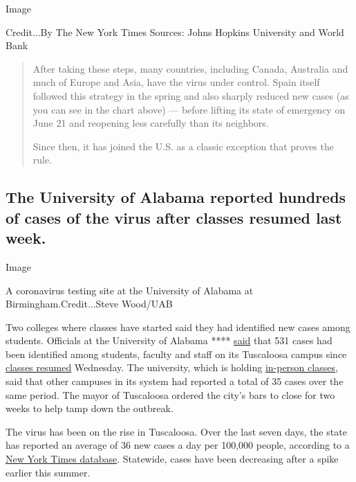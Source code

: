 Image

Credit...By The New York Times \textbar{} Sources: Johns Hopkins
University and World Bank

\begin{quote}
After taking these steps, many countries, including Canada, Australia
and much of Europe and Asia, have the virus under control. Spain itself
followed this strategy in the spring and also sharply reduced new cases
(as you can see in the chart above) --- before lifting its state of
emergency on June 21 and reopening less carefully than its neighbors.

Since then, it has joined the U.S. as a classic exception that proves
the rule.
\end{quote}

\hypertarget{the-university-of-alabama-reported-hundreds-of-cases-of-the-virus-after-classes-resumed-last-week}{%
\subsection{The University of Alabama reported hundreds of cases of the
virus after classes resumed last
week.}\label{the-university-of-alabama-reported-hundreds-of-cases-of-the-virus-after-classes-resumed-last-week}}

Image

A coronavirus testing site at the University of Alabama at
Birmingham.Credit...Steve Wood/UAB

Two colleges where classes have started said they had identified new
cases among students. Officials at the University of Alabama ****
\href{https://uasystem.edu/covid-19-dashboard?0}{said} that 531 cases
had been identified among students, faculty and staff on its Tuscaloosa
campus since
\href{https://www.al.com/news/2020/08/university-of-alabama-reports-more-than-500-confirmed-covid-19-cases.html?outputType=amp\&__twitter_impression=true}{classes
resumed} Wednesday. The university, which is holding
\href{https://www.nytimes3xbfgragh.onion/2020/08/19/business/alabama-uab-coronavirus-tests.html}{in-person
classes}, said that other campuses in its system had reported a total of
35 cases over the same period. The mayor of Tuscaloosa ordered the
city's bars to close for two weeks to help tamp down the outbreak.

The virus has been on the rise in Tuscaloosa. Over the last seven days,
the state has reported an average of 36 new cases a day per 100,000
people, according to a
\href{https://www.nytimes3xbfgragh.onion/interactive/2020/us/alabama-coronavirus-cases.html}{New
York Times database}. Statewide, cases have been decreasing after a
spike earlier this summer.

